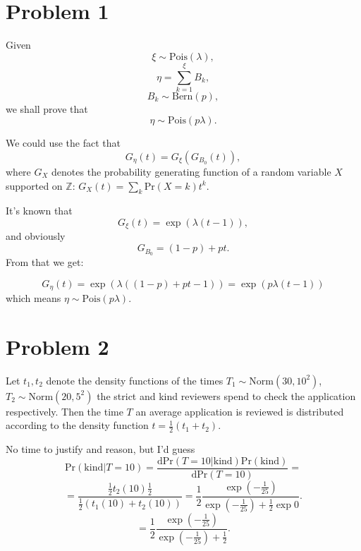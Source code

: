 \documentclass[a4paper]{article}
\begin{document}
\section{Problem 1}

Given
\[ \xi\sim\mathrm{Pois}(\lambda),\]
\[ \eta = \sum_{k=1}^\xi B_k, \]
\[ B_k\sim\mathrm{Bern}(p),\]
we shall prove that
\[ \eta\sim\mathrm{Pois}(p\lambda).\]

We could use the fact that
\[
  G_\eta(t) = G_\xi(G_{B_0}(t)),
\]
where \(G_X\) denotes the probability generating function
of a random variable \( X \) supported on \( \mathbb{Z} \):
\( G_X(t) = \sum_k \mathrm{Pr}(X=k)t^k. \)

It's known that
\[
  G_\xi(t) = \exp(\lambda(t-1)),
\]
and obviously
\[
  G_{B_0} = (1-p) + pt.
\]
From that we get:

\[
  G_\eta(t) = \exp(\lambda((1-p) + pt - 1)) = \exp(p\lambda(t-1))
\]
which means \(\eta\sim\mathrm{Pois}(p\lambda)\).

\section{Problem 2}

Let \( t_1, t_2 \)
denote the density functions of the times
\( T_1\sim\mathrm{Norm}(30, 10^2) \),
\( T_2\sim\mathrm{Norm}(20, 5^2) \)
the strict and kind reviewers spend to check the application respectively.
Then the time \( T \) an average application is reviewed is distributed
according to the density function \( t = \frac12(t_1 + t_2)\).

No time to justify and reason, but I'd guess
\[
  \mathrm{Pr}(\mathrm{kind}\big| T=10)
  = \frac{\mathrm{dPr}(T=10\big| \mathrm{kind})\mathrm{Pr}(\mathrm{kind})
  }{\mathrm{dPr}(T=10)}= \]
\[= \frac{\frac12 t_2(10) \frac12}{\frac12(t_1(10) + t_2(10))}
  = \frac12\frac{\exp(-\frac{1}{25})}{\exp(-\frac{1}{25}) + \frac12\exp0}.
\]
\[
  = \frac12\frac{\exp(-\frac{1}{25})}{\exp(-\frac{1}{25}) + \frac12}.
\]
\end{document}
